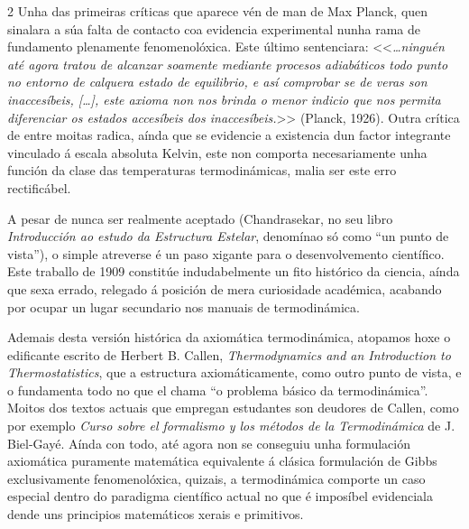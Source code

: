 \begin{refsection}
\begin{multicols}{2}
Unha das primeiras críticas que aparece vén de man de Max Planck, quen sinalara
a súa falta de contacto coa evidencia experimental nunha rama de fundamento
plenamente fenomenolóxica. Este último sentenciara: <<\textit{…ninguén até
agora tratou de alcanzar soamente mediante procesos adiabáticos todo punto no
entorno de calquera estado de equilibrio, e así comprobar se de veras son
inaccesíbeis, […], este axioma non nos brinda o menor indicio que nos permita
diferenciar os estados accesíbeis dos inaccesíbeis.}>> (Planck, 1926). Outra
crítica de entre moitas radica, aínda que se evidencie a existencia dun factor
integrante vinculado á escala absoluta Kelvin, este non comporta necesariamente
unha función da clase das temperaturas termodinámicas, malia ser este erro
rectificábel.

A pesar de nunca ser realmente aceptado (Chandrasekar, no seu libro
\textit{Introducción ao estudo da Estructura Estelar}, denomínao só como ``un
punto de vista''), o simple atreverse é un paso xigante para o desenvolvemento
científico. Este traballo de 1909 constitúe indudabelmente un fito histórico da
ciencia, aínda que sexa errado, relegado á posición de mera curiosidade
académica, acabando por ocupar un lugar secundario nos manuais de
termodinámica.

Ademais desta versión histórica da axiomática termodinámica, atopamos hoxe o
edificante escrito de Herbert B. Callen, \textit{Thermodynamics and an
Introduction to Thermostatistics}, que a estructura axiomáticamente, como outro
punto de vista, e o fundamenta todo no que el chama ``o problema básico da
termodinámica''. Moitos dos textos actuais que empregan estudantes son deudores
de Callen, como por exemplo \textit{Curso sobre el formalismo y los métodos de
la Termodinámica} de J. Biel-Gayé. Aínda con todo, até agora non se conseguiu
unha formulación axiomática puramente matemática equivalente á clásica
formulación de Gibbs exclusivamente fenomenolóxica, quizais, a termodinámica
comporte un caso especial dentro do paradigma científico actual no que é
imposíbel evidenciala dende uns principios matemáticos xerais e primitivos.

\nocite{berenguer.raa_2014}
\nocite{a.lp.berberan-santos.mn_1999}
\nocite{caratheodory.c_1909}
\nocite{planck.m_1926}
\nocite{callen.hb_1960}
\printbibliography

\end{multicols}
\end{refsection}
